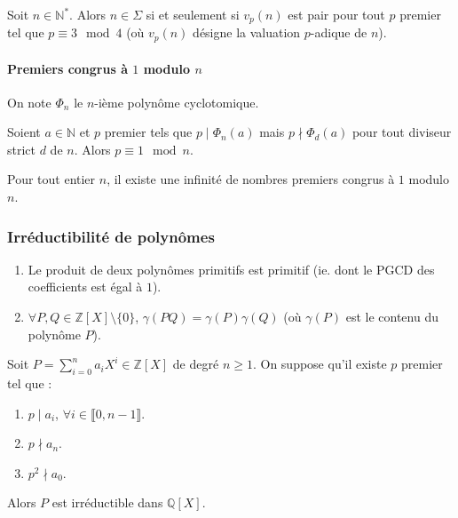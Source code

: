 	\begin{theorem}
		Soit $n \in \mathbb{N}^*$. Alors $n \in \Sigma$ si et seulement si $v_p(n)$ est pair pour tout $p$ premier tel que $p \equiv 3 \mod 4$ (où $v_p(n)$ désigne la valuation $p$-adique de $n$).
	\end{theorem}

	\paragraph{Premiers congrus à \texorpdfstring{$1$}{1} modulo \texorpdfstring{$n$}{n}}


	\begin{notation}
		On note $\Phi_n$ le $n$-ième polynôme cyclotomique.
	\end{notation}

	\begin{lemma}
		Soient $a \in \mathbb{N}$ et $p$ premier tels que $p \mid \Phi_n(a)$ mais $p \nmid \Phi_d(a)$ pour tout diviseur strict $d$ de $n$. Alors $p \equiv 1 \mod n$.
	\end{lemma}


	\begin{theorem}
		Pour tout entier $n$, il existe une infinité de nombres premiers congrus à $1$ modulo $n$.
	\end{theorem}

	\subsubsection{Irréductibilité de polynômes}


	\begin{lemma}[Gauss]
		\begin{enumerate}[label=(\roman*)]
			\item Le produit de deux polynômes primitifs est primitif (ie. dont le PGCD des coefficients est égal à $1$).
			\item $\forall P, Q \in \mathbb{Z}[X] \setminus \{ 0 \}$, $\gamma(PQ) = \gamma(P) \gamma(Q)$ (où $\gamma(P)$ est le contenu du polynôme $P$).
		\end{enumerate}
	\end{lemma}


	\begin{theorem}
		Soit $P = \sum_{i=0}^n a_i X^i \in \mathbb{Z}[X]$ de degré $n \geq 1$. On suppose qu'il existe $p$ premier tel que :
		\begin{enumerate}[label=(\roman*)]
			\item $p \mid a_i$, $\forall i \in \llbracket 0, n-1 \rrbracket$.
			\item $p \nmid a_n$.
			\item $p^2 \nmid a_0$.
		\end{enumerate}
		Alors $P$ est irréductible dans $\mathbb{Q}[X]$.
	\end{theorem}

